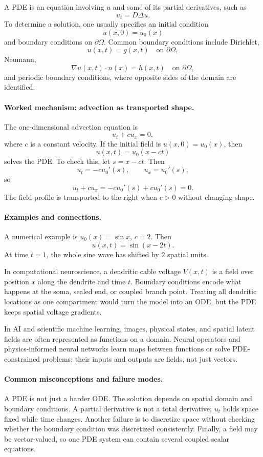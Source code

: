 A PDE is an equation involving \(u\) and some of its partial derivatives, such as
\[
u_t=D\Delta u.
\]
To determine a solution, one usually specifies an initial condition
\[
u(x,0)=u_0(x)
\]
and boundary conditions on \(\partial\Omega\). Common boundary conditions include Dirichlet,
\[
u(x,t)=g(x,t)\quad\text{on }\partial\Omega,
\]
Neumann,
\[
\nabla u(x,t)\cdot n(x)=h(x,t)\quad\text{on }\partial\Omega,
\]
and periodic boundary conditions, where opposite sides of the domain are identified.

\paragraph{Worked mechanism: advection as transported shape.}
The one-dimensional advection equation is
\[
u_t+c u_x=0,
\]
where \(c\) is a constant velocity. If the initial field is \(u(x,0)=u_0(x)\), then
\[
\boxed{u(x,t)=u_0(x-ct)}
\]
solves the PDE. To check this, let \(s=x-ct\). Then
\[
u_t=-c u_0'(s),\qquad u_x=u_0'(s),
\]
so
\[
u_t+c u_x=-c u_0'(s)+c u_0'(s)=0.
\]
The field profile is transported to the right when \(c>0\) without changing shape.

\paragraph{Examples and connections.}
A numerical example is \(u_0(x)=\sin x\), \(c=2\). Then
\[
u(x,t)=\sin(x-2t).
\]
At time \(t=1\), the whole sine wave has shifted by \(2\) spatial units.

In computational neuroscience, a dendritic cable voltage \(V(x,t)\) is a field over position \(x\) along the dendrite and time \(t\). Boundary conditions encode what happens at the soma, sealed end, or coupled branch point. Treating all dendritic locations as one compartment would turn the model into an ODE, but the PDE keeps spatial voltage gradients.

In AI and scientific machine learning, images, physical states, and spatial latent fields are often represented as functions on a domain. Neural operators and physics-informed neural networks learn maps between functions or solve PDE-constrained problems; their inputs and outputs are fields, not just vectors.

\paragraph{Common misconceptions and failure modes.}
A PDE is not just a harder ODE. The solution depends on spatial domain and boundary conditions. A partial derivative is not a total derivative; \(u_t\) holds space fixed while time changes. Another failure is to discretize space without checking whether the boundary condition was discretized consistently. Finally, a field may be vector-valued, so one PDE system can contain several coupled scalar equations.

